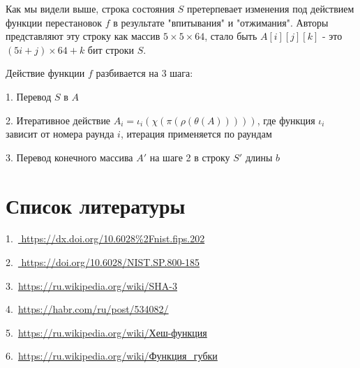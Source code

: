 \documentclass[a4paper,12pt]{article}
\theoremstyle{plain} %
\theoremstyle{definition} %
\theoremstyle{remark} %
\begin{document}
	Как мы видели выше, строка состояния $S$ претерпевает изменения под действием функции перестановок $f$ в результате "впитывания" и "отжимания". Авторы представляют эту строку как массив $5 \times 5 \times 64$, стало быть $A[i][j][k]$ - это  $(5i+j)\times 64 + k$ бит строки $S$.
	
	Действие функции $f$ разбивается на 3 шага: 
	
	1. Перевод $S$ в $A$
	
	2. Итеративное действие $A_i = \iota_i(\chi(\pi(\rho(\theta(A)))))$, где функция $\iota_i$ зависит от номера раунда $i$, итерация применяется по раундам
	
	3. Перевод конечного массива $A'$ на шаге 2 в строку $S'$ длины $b$
	
	
	
	\section{Список литературы}
	
	1.\ \href{https://dx.doi.org/10.6028%2Fnist.fips.202}{ https://dx.doi.org/10.6028\%2Fnist.fips.202}

	
	2.\ \href{https://doi.org/10.6028/NIST.SP.800-185}{ https://doi.org/10.6028/NIST.SP.800-185}
	
	3.\ \href{https://ru.wikipedia.org/wiki/SHA-3}{https://ru.wikipedia.org/wiki/SHA-3}
	
	4.\ \href{https://habr.com/ru/post/534082/}{https://habr.com/ru/post/534082/}
	
	5.\ \href{https://ru.wikipedia.org/wiki/Хеш-функция}{https://ru.wikipedia.org/wiki/Хеш-функция}
	
	6.\ \href{https://ru.wikipedia.org/wiki/Функция_губки}{https://ru.wikipedia.org/wiki/Функция\_губки}
	
	
	
	

	

	

	
	
	
	
	
\end{document}
